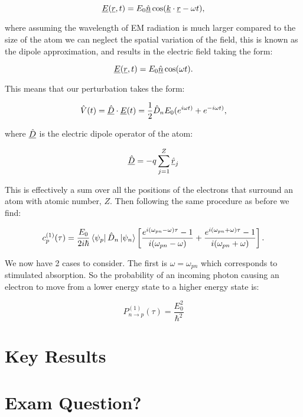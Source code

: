 \begin{equation}
    \underline{E}(\underline{r}, t) = E_0 \underline{\Hat{n}}\cos(\underline{k} \cdot \underline{r} - \omega t),
\end{equation}

\noindent where assuming the wavelength of EM radiation is much larger compared to the size of the atom we can neglect the spatial variation of the field, this is known as the dipole approximation, and results in the electric field taking the form:

\begin{equation}
    \underline{E}(\underline{r}, t) = E_0 \underline{\Hat{n}}\cos(\omega t).
    \label{DipoleApproximationElectricField}
\end{equation}

\noindent This means that our perturbation takes the form:

\begin{equation}
    \Hat{V}(t) = \underline{\Hat{D}} \cdot \underline{E}(t) = \frac{1}{2} \Hat{D}_n E_0 (e^{i\omega t)} + e^{-i\omega t)}
    \label{PerturbationEM},
\end{equation}

\noindent where $\underline{\Hat{D}}$ is the electric dipole operator of the atom:

\begin{equation}
    \underline{\Hat{D}} = -q \sum_{j = 1}^Z \underline{\Hat{r}}_j
    \label{ElectricDipoleOperator}
\end{equation}

\noindent This is effectively a sum over all the positions of the electrons that surround an atom with atomic number, $Z$. Then following the same procedure as before we find:

\begin{equation}
    c^{(1)}_p(\tau) = \frac{E_0}{2i\hbar}\bra{\psi_p} \Hat{D}_n \ket{\psi_n}\left[\frac{e^{i(\omega_{pn} - \omega)\tau} - 1}{i(\omega_{pn} - \omega)} + \frac{e^{i(\omega_{pn} + \omega)\tau} - 1}{i(\omega_{pn} + \omega)}\right].
    \label{CoefficientEM}
\end{equation}

We now have 2 cases to consider. The first is $\omega = \omega_{pn}$ which corresponds to stimulated absorption. So the probability of an incoming photon causing an electron to move from a lower energy state to a higher energy state is:

\begin{equation}
    P^{(1)}_{n\rightarrow p}(\tau) = \frac{E_0^2}{\hbar^2}
\end{equation}

\section{Key Results}

\section{Exam Question?}

